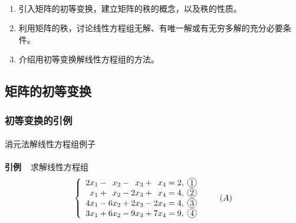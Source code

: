 \paragraph{}
\begin{enumerate}
  \item 引入矩阵的初等变换，建立矩阵的秩的概念，以及秩的性质。
  \item 利用矩阵的秩，讨论线性方程组无解、有唯一解或有无穷多解的充分必要条件。
  \item 介绍用初等变换解线性方程组的方法。
\end{enumerate}

\subsection{矩阵的初等变换}
\subsubsection{初等变换的引例}
\paragraph{}
消元法解线性方程组例子

\paragraph{}
\textbf{引例~~}求解线性方程组
\begin{equation*}
  \left\{\begin{array}{c}
            2x_1 - \enspace x_2 - \enspace x_3 + \enspace x_4 = 2, \; \circled{1} \\
    \enspace x_1 + \enspace x_2 -         2x_3 + \enspace x_4 = 4, \; \circled{2} \\
            4x_1 -         6x_2 +         2x_3 -         2x_4 = 4, \; \circled{3} \\
            3x_1 +         6x_2 -         9x_3 +         7x_4 = 9, \; \circled{4}
  \end{array} \right. \tag{$A$}
\end{equation*}

